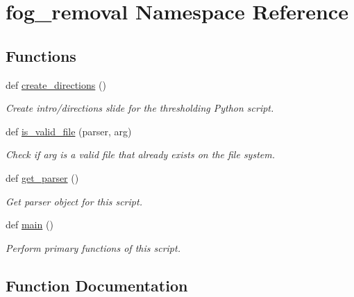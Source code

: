 \hypertarget{namespacefog__removal}{}\section{fog\+\_\+removal Namespace Reference}
\label{namespacefog__removal}
\subsection*{Functions}
\begin{DoxyCompactItemize}
\item 
def \hyperlink{namespacefog__removal_acc10907c635ab765dcf02a6fc6499620}{create\+\_\+directions} ()
\begin{DoxyCompactList}\small\item\em Create intro/directions slide for the thresholding Python script. \end{DoxyCompactList}\item 
def \hyperlink{namespacefog__removal_a7b07384f6a6ff8498e14f3aa5f8e2252}{is\+\_\+valid\+\_\+file} (parser, arg)
\begin{DoxyCompactList}\small\item\em Check if arg is a valid file that already exists on the file system. \end{DoxyCompactList}\item 
def \hyperlink{namespacefog__removal_a89c98f8f9a6d048485938fc05675ce9e}{get\+\_\+parser} ()
\begin{DoxyCompactList}\small\item\em Get parser object for this script. \end{DoxyCompactList}\item 
def \hyperlink{namespacefog__removal_a427a577da8405e5624962d7ef722aadf}{main} ()
\begin{DoxyCompactList}\small\item\em Perform primary functions of this script. \end{DoxyCompactList}\end{DoxyCompactItemize}


\subsection{Function Documentation}
\mbox{\label{namespacefog__removal_acc10907c635ab765dcf02a6fc6499620}} 
